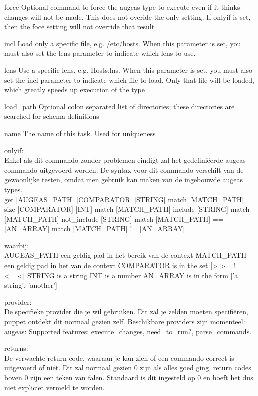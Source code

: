 force
Optional command to force the augeas type to execute even if it thinks changes will not be made. This does not overide the only setting. If onlyif is set, then the foce setting will not override that result

incl
Load only a specific file, e.g. /etc/hosts. When this parameter is set, you must also set the lens parameter to indicate which lens to use.

lens
Use a specific lens, e.g. Hosts.lns. When this parameter is set, you must also set the incl parameter to indicate which file to load. Only that file will be loaded, which greatly speeds up execution of the type

load\_path
Optional colon separated list of directories; these directories are searched for schema definitions

name
The name of this task. Used for uniqueness

onlyif:\\
Enkel als dit commando zonder problemen eindigt zal het gedefini\"{e}erde augeas commando uitgevoerd worden. De syntax voor dit commando verschilt van de gewoonlijke testen, omdat men gebruik kan maken van de ingebouwde augeas types.\\
get [AUGEAS\_PATH] [COMPARATOR] [STRING]
match [MATCH\_PATH] size [COMPARATOR] [INT]
match [MATCH\_PATH] include [STRING]
match [MATCH\_PATH] not\_include [STRING]
match [MATCH\_PATH] == [AN\_ARRAY]
match [MATCH\_PATH] != [AN\_ARRAY]

waarbij:\\
AUGEAS\_PATH een geldig pad in het bereik van de context
MATCH\_PATH een geldig pad in het van de context
COMPARATOR is in the set [> >= != == <= <]
STRING is a string
INT is a number
AN\_ARRAY is in the form ['a string', 'another']

provider:\\
De specifieke provider die je wil gebruiken. Dit zal je zelden moeten specifi\"{e}ren, puppet ontdekt dit normaal gezien zelf. Beschikbare providers zijn momenteel:\\
augeas: Supported features: execute\_changes, need\_to\_run?, parse\_commands.

returns:\\
De verwachte return code, waaraan je kan zien of een commando correct is uitgevoerd of niet. Dit zal normaal gezien 0 zijn als alles goed ging, return codes boven 0 zijn een teken van falen. Standaard is dit ingesteld op 0 en hoeft het dus niet expliciet vermeld te worden.


